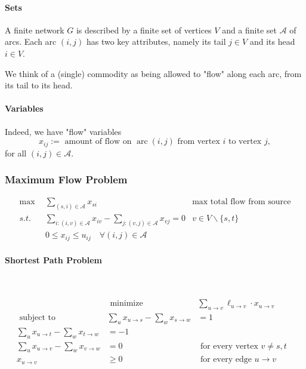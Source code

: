 \paragraph{Sets}
A finite network $G$ is described by a finite set of vertices $V$ and a finite set $\mathcal{A}$ of arcs. Each arc $(i,j)$ has two key attributes, namely its tail $j \in V$ and its head $i \in V$. 


We think of a (single) commodity as being allowed to "flow" along each arc, from its tail to its head. 
\paragraph{Variables}
Indeed, we have "flow" variables
$$
x_{ij}:=\text { amount of flow on } \operatorname{arc} (i,j) \text{ from vertex $i$ to vertex $j$},
$$
for all $(i,j) \in \mathcal{A}$. 



\subsubsection{Maximum Flow Problem}

\begin{tcolorbox}
\begin{align}
\max \ \ & \sum_{(s, i) \in \mathcal{A}} x_{si} &
\text{max total flow from source}\\
s.t.\ \ 
&\sum_{i : (i,v) \in \mathcal A} x_{i v}-\sum_{j : (v,j) \in \mathcal{A}} x_{v j} =0  &  v \in V \backslash\{s, t\}\\
&0 \leq x_{ij} \leq  u_{ij} \quad \forall(i,j) \in \mathcal{A}
\end{align}

\end{tcolorbox}
%

\paragraph{Shortest Path Problem}
~\\

\begin{tcolorbox}
$$
\begin{aligned}
& \text { minimize } & \sum_{u \rightarrow v} \ell_{u \rightarrow v} \cdot x_{u \rightarrow v} & \\
\text { subject to } & \sum_{u} x_{u \rightarrow s}-\sum_{w} x_{s \rightarrow w} &=1 & \\
\sum_{u} x_{u \rightarrow t}-\sum_{w} x_{t \rightarrow w} &=-1 & \\
\sum_{u} x_{u \rightarrow v}-\sum_{w} x_{v \rightarrow w} &=0 & \text { for every vertex } v \neq s, t \\
x_{u \rightarrow v} & \geq 0 & \text { for every edge } u \rightarrow v
\end{aligned}
$$
\end{tcolorbox}

